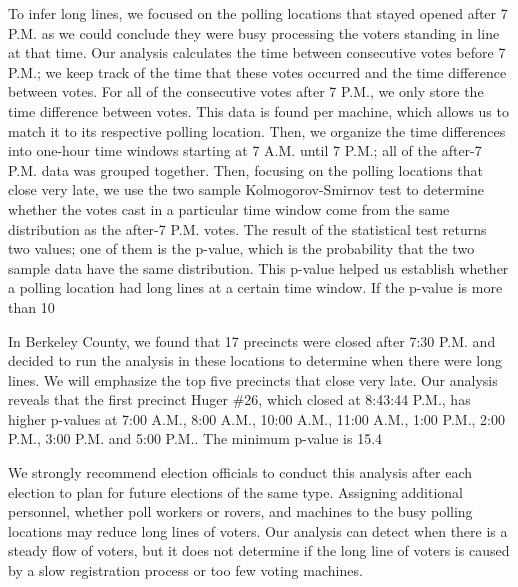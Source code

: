 To infer long lines, we focused on the polling locations that stayed opened after 7 P.M. as we could conclude they were busy processing the voters standing in line at that time. Our analysis calculates the time between consecutive votes before 7 P.M.; we keep track of the time that these votes occurred and the time difference between votes.  For all of the consecutive votes after 7 P.M., we only store the time difference between votes.  This data is found per machine, which allows us to match it to its respective polling location.  Then, we organize the time differences into one-hour time windows starting at 7 A.M. until 7 P.M.; all of the after-7 P.M. data was grouped together.  Then, focusing on the polling locations that close very late, we use the two sample Kolmogorov-Smirnov test to determine whether the votes cast in a particular time window come from the same distribution as the after-7 P.M. votes.  The result of the statistical test returns two values; one of them is the p-value, which is the probability that the two sample data have the same distribution.  This p-value helped us establish whether a polling location had long lines at a certain time window.  If the p-value is more than 10%

In Berkeley County, we found that 17 precincts were closed after 7:30 P.M. and decided to run the analysis in these locations to determine when there were long lines.  We will emphasize the top five precincts that close very late.  Our analysis reveals that the first precinct Huger \#26, which closed at 8:43:44 P.M., has higher p-values at 7:00 A.M., 8:00 A.M., 10:00 A.M., 11:00 A.M., 1:00 P.M., 2:00 P.M., 3:00 P.M. and 5:00 P.M..  The minimum p-value is 15.4%

We strongly recommend election officials to conduct this analysis after each election to plan for future elections of the same type. Assigning additional personnel, whether poll workers or rovers, and machines to the busy polling locations may reduce long lines of voters.  Our analysis can detect when there is a steady flow of voters, but it does not determine if the long line of voters is caused by a slow registration process or too few voting machines.

